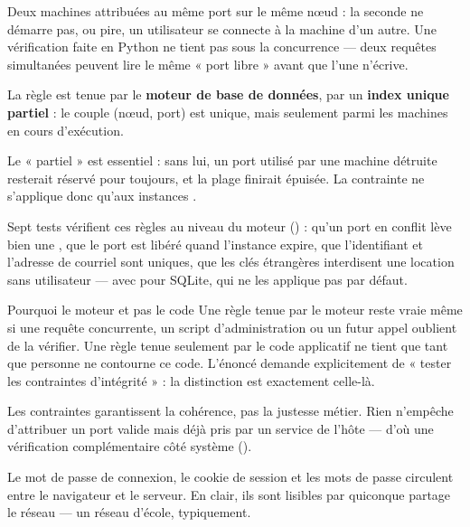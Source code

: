 
\menace
Deux machines attribuées au même port sur le même nœud : la seconde ne démarre
pas, ou pire, un utilisateur se connecte à la machine d'un autre. Une
vérification faite en Python ne tient pas sous la concurrence --- deux requêtes
simultanées peuvent lire le même « port libre » avant que l'une n'écrive.

\parade
La règle est tenue par le \textbf{moteur de base de données}, par un
\textbf{index unique partiel} : le couple (nœud, port) est unique, mais
seulement parmi les machines en cours d'exécution.

\danslecode
Le « partiel » est essentiel : sans lui, un port utilisé par une machine
détruite resterait réservé pour toujours, et la plage finirait épuisée. La
contrainte ne s'applique donc qu'aux instances .

Sept tests vérifient ces règles au niveau du moteur
() : qu'un port en conflit lève bien une
, que le port est libéré quand l'instance expire, que
l'identifiant et l'adresse de courriel sont uniques, que les clés étrangères
interdisent une location sans utilisateur --- avec
 pour SQLite, qui ne les applique pas par
défaut.

\begin{notion}{Pourquoi le moteur et pas le code}
Une règle tenue par le moteur reste vraie même si une requête concurrente, un
script d'administration ou un futur appel oublient de la vérifier. Une règle
tenue seulement par le code applicatif ne tient que tant que personne ne
contourne ce code. L'énoncé demande explicitement de « tester les contraintes
d'intégrité » : la distinction est exactement celle-là.
\end{notion}

\limite
Les contraintes garantissent la cohérence, pas la justesse métier. Rien
n'empêche d'attribuer un port valide mais déjà pris par un service de l'hôte
--- d'où une vérification complémentaire côté système
().


\menace
Le mot de passe de connexion, le cookie de session et les mots de passe
 circulent entre le navigateur et le serveur. En clair, ils sont
lisibles par quiconque partage le réseau --- un réseau d'école, typiquement.

